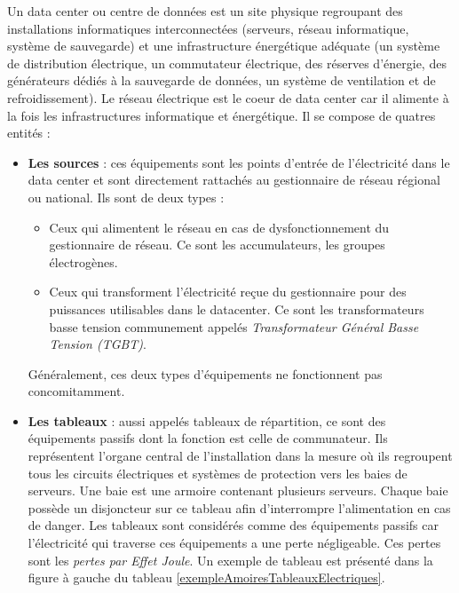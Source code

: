 Un data center ou centre de donn\'ees est un site physique regroupant des installations informatiques interconnect\'ees (serveurs, r\'eseau informatique, syst\`eme de sauvegarde) et une infrastructure \'energ\'etique ad\'equate (un syst\`eme de distribution \'electrique, un commutateur \'electrique, des r\'eserves d'\'energie, des g\'en\'erateurs d\'edi\'es \`a la sauvegarde de donn\'ees, un syst\`eme de ventilation et de refroidissement).
\newline
Le r\'eseau \'electrique est le coeur de data center car il alimente \`a la fois les infrastructures informatique et \'energ\'etique. Il se compose de quatres entit\'es :
\begin{itemize}
\item {\bf Les sources} : 
ces \'equipements sont les points d'entr\'ee de l'\'electricit\'e dans le data center et sont directement rattach\'es au gestionnaire de r\'eseau r\'egional ou national. 
Ils sont de deux types : 
\begin{itemize}
\item Ceux qui alimentent le  r\'eseau en cas de dysfonctionnement du gestionnaire de r\'eseau. Ce sont les accumulateurs, les groupes \'electrog\`enes.
\item Ceux qui transforment l'\'electricit\'e re\c cue du gestionnaire pour des puissances utilisables dans le datacenter. Ce sont les transformateurs basse tension communement appel\'es {\em Transformateur G\'en\'eral Basse Tension (TGBT)}. 
\end{itemize}
G\'en\'eralement, ces deux types d'\'equipements ne fonctionnent pas concomitamment.


\item {\bf Les tableaux} :
aussi appel\'es tableaux de r\'epartition, ce sont des \'equipements passifs dont la fonction est celle de communateur. 
Ils repr\'esentent l'organe central de l'installation dans la mesure o\`u ils regroupent tous les circuits \'electriques et syst\`emes de protection vers les baies de serveurs. 
Une baie est une armoire contenant plusieurs serveurs.
Chaque baie poss\`ede un disjoncteur sur ce tableau afin d'interrompre l'alimentation en cas de danger. 
Les tableaux sont consid\'er\'es comme des \'equipements passifs car l'\'electricit\'e qui traverse ces \'equipements a une perte n\'egligeable.   Ces pertes sont les {\em pertes par Effet Joule}. Un exemple de tableau est pr\'esent\'e dans la figure \`a gauche du tableau \ref{exempleAmoiresTableauxElectriques}. 


\end{itemize}

